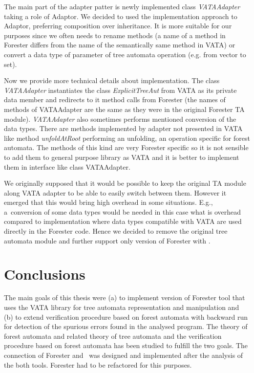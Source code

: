 \documentclass[fleqn,11pt]{ExcelAtFIT} %
\begin{document}
The main part of the adapter patter is newly implemented class \emph{VATAAdapter} taking a role of Adaptor.
We decided to used the implementation approach to Adaptor, preferring composition over inheritance.
It is more suitable for our purposes since we often needs to rename methods 
(a name of a method in Forester differs from the name of the semantically same method in VATA)
or convert a data type of parameter of tree automata operation (e.g. from vector to set). 

Now we provide more technical details about implementation.
The class \emph{VATAAdapter} instantiates the class \emph{ExplicitTreeAut} from VATA as its private data member
and redirects to it method calls from Forester (the names of methods of VATAAdapter are the same as they were
in the original Forester TA module).
\emph{VATAAdapter} also sometimes performs mentioned conversion of the data types.
There are methods implemented by adapter not presented in VATA like method \emph{unfoldAtRoot}
performing an unfolding, an operation specific for forest automata.
The methods of this kind are very Forester specific so it is not sensible to add them to general purpose library as VATA
and it is better to implement them in interface like class VATAAdapter.

We originally supposed that it would be possible to keep the original TA module along VATA adapter
to be able to easily switch between them.
However it emerged that this would bring high overhead in some situations.
E.g., a~conversion of some data types would be needed in this case
what is overhead compared to implementation where data types compatible with VATA are used directly in the Forester code.
Hence we decided to remove the original tree automata module and further support only version of Forester with \vata.

\section{Conclusions}
\label{sec:concl}

The main goals of this thesis were (a) to implement version of Forester tool that uses the VATA library for tree automata representation and manipulation
and (b) to extend verification procedure based on forest automata with backward run for detection of the spurious errors found in the analysed program.
The theory of forest automata and related theory of tree automata and the verification procedure based on forest automata has been studied to fulfill the two goals.
The connection of Forester and \vata\ was designed and implemented after the analysis of the both tools.
Forester had to be refactored for this purposes.
\end{document}
